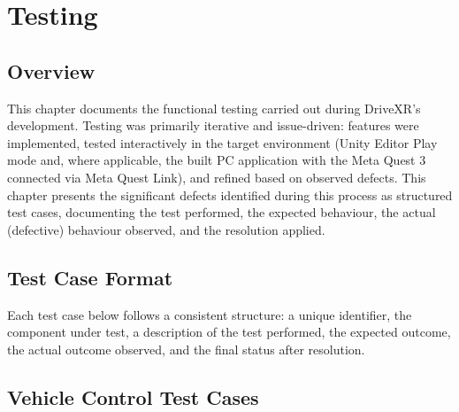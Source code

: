 \chapter{Testing}
\label{ch:testing}

\section{Overview}
This chapter documents the functional testing carried out during DriveXR's development. Testing was primarily iterative and issue-driven: features were implemented, tested interactively in the target environment (Unity Editor Play mode and, where applicable, the built PC application with the Meta Quest 3 connected via Meta Quest Link), and refined based on observed defects. This chapter presents the significant defects identified during this process as structured test cases, documenting the test performed, the expected behaviour, the actual (defective) behaviour observed, and the resolution applied.

\section{Test Case Format}
Each test case below follows a consistent structure: a unique identifier, the component under test, a description of the test performed, the expected outcome, the actual outcome observed, and the final status after resolution.

\section{Vehicle Control Test Cases}

